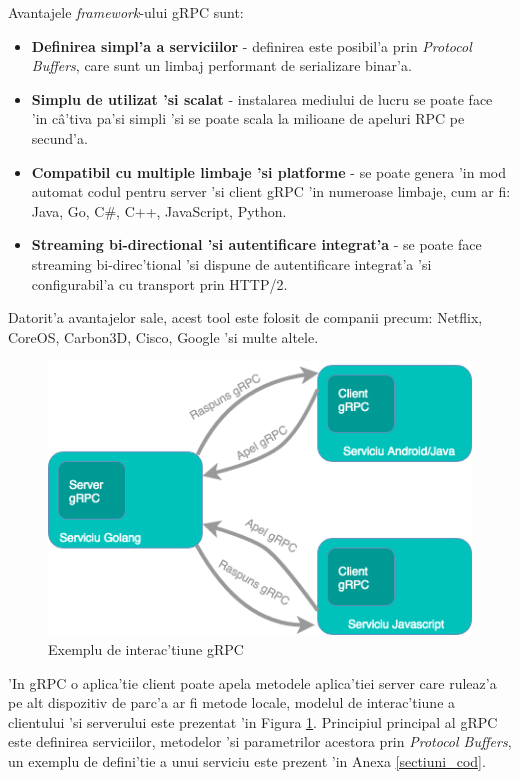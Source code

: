 \documentclass[12pt,a4paper,twoside]{report}
\begin{document}
Avantajele \textit{framework}-ului gRPC sunt:
\begin{itemize}
\item{\textbf{Definirea simpl'a a serviciilor} - definirea este posibil'a prin \textit{Protocol Buffers}, care sunt un limbaj performant de serializare binar'a.}
\item{\textbf{Simplu de utilizat 'si scalat} - instalarea mediului de lucru se poate face 'in câ'tiva pa'si simpli 'si se poate scala la milioane de apeluri RPC pe secund'a.}
\item{\textbf{Compatibil cu multiple limbaje 'si platforme} - se poate genera 'in mod automat codul pentru server 'si client gRPC 'in numeroase limbaje, cum ar fi: Java, Go, C\#, C++, JavaScript, Python. }
\item{\textbf{Streaming bi-directional 'si autentificare integrat'a} - se poate face streaming bi-direc'tional 'si dispune de autentificare integrat'a 'si configurabil'a cu transport prin HTTP/2.}
\end{itemize}
Datorit'a avantajelor sale, acest tool este folosit de companii precum: Netflix, CoreOS, Carbon3D, Cisco, Google 'si multe altele.
\begin{figure}[H]
\begin{center}
\advance\leftskip-3cm
\advance\rightskip-3cm
\includegraphics[keepaspectratio=true,scale=0.5]{img/gRPC_example.png}
\caption{Exemplu de interac'tiune gRPC}
\label{gRPC_example}
\end{center}
\end{figure}
'In gRPC o aplica'tie client poate apela metodele aplica'tiei server care ruleaz'a pe alt dispozitiv de parc'a ar fi metode locale, modelul de interac'tiune a clientului 'si serverului este prezentat 'in Figura \ref{gRPC_example}. Principiul principal al gRPC este definirea serviciilor, metodelor 'si parametrilor acestora prin \textit{Protocol Buffers}, un exemplu de defini'tie a unui serviciu este prezent 'in Anexa \ref{sectiuni_cod}.
\end{document}
